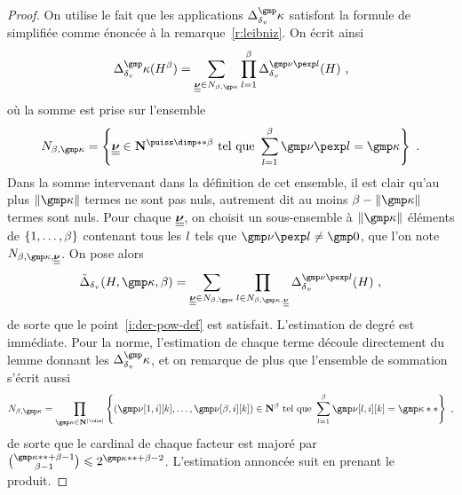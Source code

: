 \begin{proof}
  On utilise le fait que les applications \( \pmnum_\dv^\dermp \) satisfont la
  formule de  simplifiée comme énoncée à la
  remarque~\ref{r:leibniz}. On écrit ainsi
  \begin{equation}
    \pmnum_\dv^\dermp(H^\beta)
    =
    \sum_{\gmmp\nu \in N_{\beta, \derp}}
    \prod_{\indi = 1}^{\beta}
    \pmnum_\dv^{ \gmp\nu\pexp\indi }(H)
    \pmm,
  \end{equation}
  où la somme est prise sur l'ensemble
  \begin{equation}
    N_{\beta, \dermp} = \left\{
      \gmmp\nu \in \N^{\puiss\dimp**\beta}
      \text{ tel que }
      \sum_{\indi = 1}^{\beta} \gmp\nu\pexp\indi = \dermp
    \right\}
    \pmm.
  \end{equation}
  Dans la somme intervenant dans la définition de cet ensemble, il est clair
  qu'au plus \( \lgt\dermp \) termes ne sont pas nuls, autrement dit au moins
  \( \beta - \lgt\dermp \) termes sont nuls. Pour chaque \( \underline{\underline{\boldsymbol{\nu}}} \), on
  choisit un sous-ensemble à \( \lgt\dermp \) éléments de \( \lbrace1, \dots,
      \beta\rbrace \) contenant tous les \( l \) tels que \( \gmp\nu\pexp\indi
    \neq \gmp 0 \), que l'on note \( N_{\beta, \dermp, \gmmp\nu} \). On pose
  alors
  \begin{equation}
    \tilde\pmnum_\dv(H, \dermp, \beta)
    =
    \sum_{\gmmp\nu \in N_{\beta, \derp}}
    \prod_{\indi \in N_{\beta, \dermp, \gmmp\nu}}
    \pmnum_\dv^{ \gmp\nu\pexp\indi }(H)
    \pmm,
  \end{equation}
  de sorte que le point~\ref{i:der-pow-def} est satisfait. L'estimation de
  degré est immédiate. Pour la norme, l'estimation de chaque terme découle
  directement du lemme donnant les \( \pmnum_\dv^\dermp \), et on remarque de
  plus que l'ensemble de sommation s'écrit aussi
  \begin{equation}
    N_{\beta, \dermp} =
    \prod_{ \dermp \in \N^{\lgr\vdim} }
    \left\{
      (\gmp\nu[1, \fct][\ind], \dots, \gmp\nu[\beta, \fct][\ind])
      \in \N^\beta
      \text{ tel que }
      \sum_{\indi = 1}^{\beta} \gmp\nu[\indi, \fct][\ind] = \dermp**
    \right\}
    \pmm,
  \end{equation}
  de sorte que le cardinal de chaque facteur est majoré par \( \binom{\dermp**
      + \beta - 1}{\beta - 1} \le 2^{\dermp** + \beta - 2} \). L'estimation
  annoncée suit en prenant le produit.
\end{proof}


